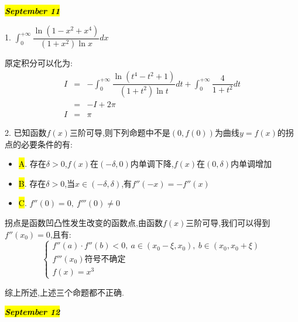 \hl{\textbf{\textit{September 11}}}

1. $\int_{0}^{+\infty}\dfrac{\ln(1-x^2+x^4)}{(1+x^2)\ln x}dx$
\begin{solution}

	原定积分可以化为:  
	\begin{eqnarray*}
		I&=&-\int_{0}^{+\infty}\dfrac{\ln (t^4-t^2+1)}{(1+t^2)\ln t}dt+\int_{0}^{+\infty}\dfrac{4}{1+t^2}dt\\
		&=&-I+2\pi\\
		I&=&\pi
	\end{eqnarray*}
\end{solution}

2. 已知函数$f(x)$三阶可导,则下列命题中不是$(0,f(0))$为曲线$y=f(x)$的拐点的必要条件的有:  
\begin{itemize}
	\item \hl{A}. 存在$\delta>0$,$f(x)$在$(-\delta,0)$内单调下降,$f(x)$在$(0,\delta)$内单调增加
	\item \hl{B}. 存在$\delta>0$,当$x\in(-\delta,\delta)$,有$f''(-x)=-f''(x)$
	\item \hl{C}. $f''(0)=0,\ f'''(0)\neq 0$
\end{itemize}
\begin{solution}

	拐点是函数凹凸性发生改变的函数点,由函数$f(x)$三阶可导,我们可以得到$f''(x_{0})=0$,且有:  
	$$\left\lbrace
	\begin{array}{l}
		f''(a)\cdot f''(b)<0,\ a\in(x_{0}-\xi,x_{0}),\ b\in(x_{0},x_{0}+\xi)\\
		f'''(x_{0})\text{符号不确定}\\
		f(x)=x^3
	\end{array}
	\right. $$
	
	综上所述,上述三个命题都不正确.
\end{solution}

\hl{\textbf{\textit{September 12}}}


